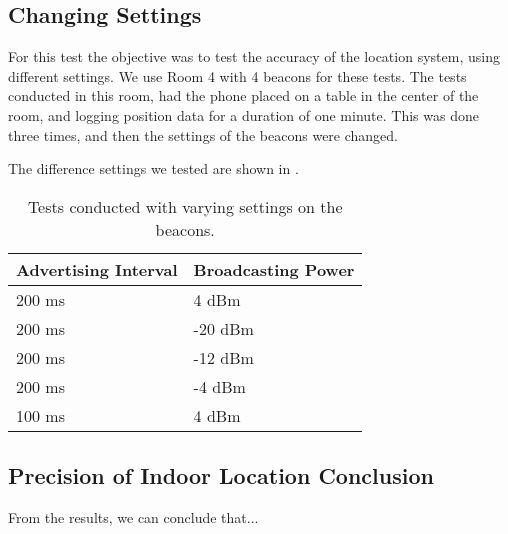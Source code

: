\subsection{Changing Settings}\label{sec:settings}
For this test the objective was to test the accuracy of the location system,
using different settings. 
We use Room 4 with 4 beacons for these tests. 
The tests conducted in this room, 
had the phone placed on a table in the center of the room, 
and logging position data for a duration of one minute.
This was done three times, 
and then the settings of the beacons were changed.

The difference settings we tested are shown in .

\begin{table}[!htb]
  \centering
  \begin{tabular}{l|l}
    Advertising Interval & Broadcasting Power \\ \hline
    200 ms               & 4 dBm              \\ 
    200 ms               & -20 dBm            \\ 
    200 ms               & -12 dBm            \\ 
    200 ms               & -4 dBm             \\ 
    100 ms               & 4 dBm              \\ 
  \end{tabular}
  \caption{Tests conducted with varying settings on the beacons.}
  \label{table:precisiontest:settings}
\end{table}


\subsection{Precision of Indoor Location Conclusion}
From the results, we can conclude that... 
